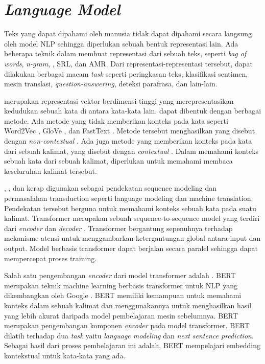 \section{\textit{Language Model}}

Teks yang dapat dipahami oleh manusia tidak dapat dipahami secara langsung oleh model \gls{NLP} sehingga diperlukan sebuah bentuk representasi lain.
Ada beberapa teknik dalam membuat representasi dari sebuah teks, seperti \textit{bag of words}, \textit{n-gram}, \wordem{}, \gls{SRL}, dan \gls{AMR}.
Dari representasi-representasi tersebut, dapat dilakukan berbagai macam \textit{task} seperti peringkasan teks, klasifikasi sentimen, mesin translasi, \textit{question-answering}, deteksi parafrasa, dan lain-lain.

\Wordem{} merupakan representasi vektor berdimensi tinggi yang merepresentasikan kedudukan sebuah kata di antara kata-kata lain.
\Wordem{} dapat dibentuk dengan berbagai metode.
Ada metode yang tidak memberikan konteks pada kata seperti Word2Vec , GloVe , dan FastText .
Metode tersebut menghasilkan yang disebut dengan \textit{non-contextual} \wordem{}.
Ada juga metode yang memberikan konteks pada kata dari sebuah kalimat, yang disebut dengan \textit{contextual} \wordem{}.
Dalam memahami konteks sebuah kata dari sebuah kalimat, diperlukan untuk memahami membaca keseluruhan kalimat tersebut.

, , dan  kerap digunakan sebagai pendekatan sequence modeling dan permasalahan transduction seperti language modeling dan machine translation.
Pendekatan tersebut berguna untuk memahami konteks sebuah kata pada suatu kalimat.
Transformer merupakan sebuah sequence-to-sequence model yang terdiri dari \textit{encoder} dan \textit{decoder} .
Transformer bergantung sepenuhnya terhadap mekanisme atensi untuk menggambarkan ketergantungan global antara input dan output.
Model berbasis transformer dapat berjalan secara paralel sehingga dapat mempercepat proses training.

Salah satu pengembangan \textit{encoder} dari model transformer adalah .
\gls{BERT} merupakan teknik machine learning berbasis transformer untuk \gls{NLP} yang dikembangkan oleh Google .
\gls{BERT} memiliki kemampuan untuk memahami konteks dalam sebuah kalimat dan menggunakannya untuk menghasilkan hasil yang lebih akurat daripada model pembelajaran mesin sebelumnya.
\gls{BERT} merupakan pengembangan komponen \textit{encoder} pada model transformer.
\gls{BERT} dilatih terhadap dua \textit{task} yaitu \textit{language modeling} dan \textit{next sentence prediction}.
Sebagai hasil dari proses pembelajaran ini adalah, \gls{BERT} mempelajari embedding kontekstual untuk kata-kata yang ada.

